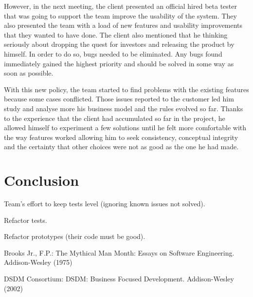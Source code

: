 \documentclass[lnbip]{svmultln}
\begin{document}
However, in the next meeting, the client presented an official hired
beta tester that was going to support the team improve the usability
of the system. They also presented the team with a load of new
features and usability improvements that they wanted to have done. The
client also mentioned that he thinking seriously about dropping the
quest for investors and releasing the product by himself. In order to
do so, bugs needed to be eliminated. Any bugs found immediately gained
the highest priority and should be solved in some way as soon as
possible.

With this new policy, the team started to find problems with the
existing features because some cases conflicted. Those issues reported
to the customer led him study and analyse more his business model and
the rules evolved so far. Thanks to the experience that the client had
accumulated so far in the project, he allowed himself to experiment a
few solutions until he felt more comfortable with the way features
worked allowing him to seek consistency, conceptual integrity and the
certainty that other choices were not as good as the one he had made.

\section{Conclusion}
\label{sec:conclusion}

Team's effort to keep tests level (ignoring known issues not solved).

Refactor tests.

Refactor prototypes (their code must be good).

%
%
\begin{thebibliography}{5}

 Brooks Jr., F.P.: The Mythical Man Month: Essays
  on Software Engineering. Addison-Wesley (1975)

 DSDM Consortium: DSDM: Business Focused
  Development. Addison-Wesley (2002)




\end{thebibliography}
%
\end{document}
